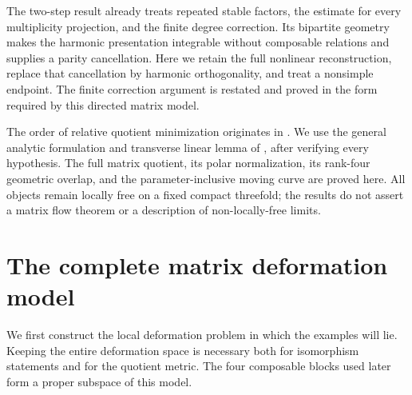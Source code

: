 \documentclass[11pt]{amsart}
\theoremstyle{definition}
\theoremstyle{remark}
\begin{document}
The two-step result \cite{WuebbenRepeated26} already treats repeated
stable factors, the estimate for every multiplicity projection, and
the finite degree correction. Its bipartite geometry makes the harmonic
presentation integrable without composable relations and supplies a
parity cancellation. Here we retain the full nonlinear reconstruction,
replace that cancellation by harmonic orthogonality, and treat a
nonsimple endpoint. The finite correction argument is restated and
proved in the form required by this directed matrix model.

The order of relative quotient minimization originates in
\cite{WuebbenRelativeMetrics26}. We use the general analytic formulation
and transverse linear lemma of \cite{WuebbenWallMetrics26}, after
verifying every hypothesis. The full matrix quotient, its polar
normalization, its rank-four geometric overlap, and the parameter-inclusive
moving curve are proved here. All objects remain locally free on a
fixed compact threefold; the results do not assert a matrix flow
theorem or a description of non-locally-free limits.

\section{The complete matrix deformation model}\label{sec:model}

We first construct the local deformation problem in which the examples
will lie. Keeping the entire deformation space is necessary both for
isomorphism statements and for the quotient metric. The four composable
blocks used later form a proper subspace of this model.
\end{document}
